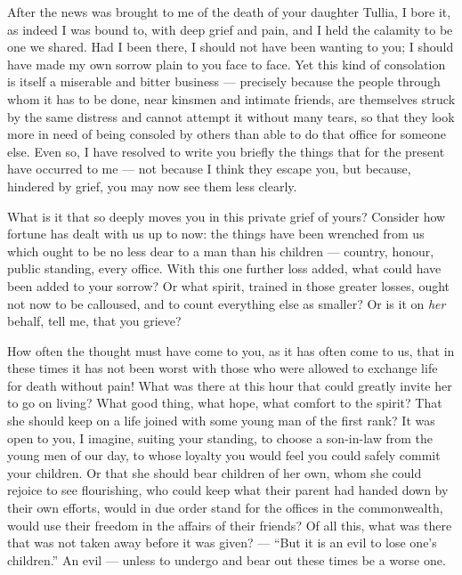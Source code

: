 

 After the news was brought to me of the death of your daughter Tullia, I bore it, as indeed I was bound to, with deep grief and pain, and I held the calamity to be one we shared. Had I been there, I should not have been wanting to you; I should have made my own sorrow plain to you face to face. Yet this kind of consolation is itself a miserable and bitter business --- precisely because the people through whom it has to be done, near kinsmen and intimate friends, are themselves struck by the same distress and cannot attempt it without many tears, so that they look more in need of being consoled by others than able to do that office for someone else. Even so, I have resolved to write you briefly the things that for the present have occurred to me --- not because I think they escape you, but because, hindered by grief, you may now see them less clearly.

 What is it that so deeply moves you in this private grief of yours? Consider how fortune has dealt with us up to now: the things have been wrenched from us which ought to be no less dear to a man than his children --- country, honour, public standing, every office. With this one further loss added, what could have been added to your sorrow? Or what spirit, trained in those greater losses, ought not now to be calloused, and to count everything else as smaller? Or is it on \textit{her} behalf, tell me, that you grieve?

 How often the thought must have come to you, as it has often come to us, that in these times it has not been worst with those who were allowed to exchange life for death without pain! What was there at this hour that could greatly invite her to go on living? What good thing, what hope, what comfort to the spirit? That she should keep on a life joined with some young man of the first rank? It was open to you, I imagine, suiting your standing, to choose a son-in-law from the young men of our day, to whose loyalty you would feel you could safely commit your children. Or that she should bear children of her own, whom she could rejoice to see flourishing, who could keep what their parent had handed down by their own efforts, would in due order stand for the offices in the commonwealth, would use their freedom in the affairs of their friends? Of all this, what was there that was not taken away before it was given? --- ``But it is an evil to lose one's children.'' An evil --- unless to undergo and bear out these times be a worse one.

